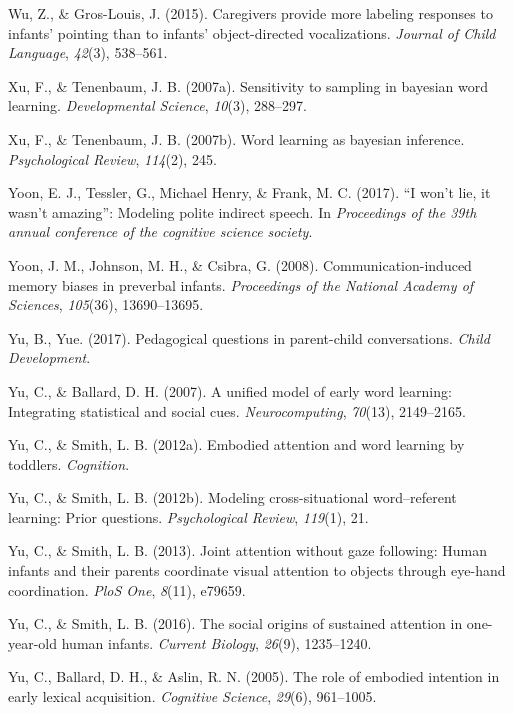 \documentclass[english,floatsintext,man]{apa6}
\theoremstyle{definition}
\theoremstyle{definition}
\theoremstyle{definition}
\theoremstyle{remark}
\begin{document}
\hypertarget{ref-wu2015caregivers}{}
Wu, Z., \& Gros-Louis, J. (2015). Caregivers provide more labeling
responses to infants' pointing than to infants' object-directed
vocalizations. \emph{Journal of Child Language}, \emph{42}(3), 538--561.

\hypertarget{ref-xu2007sampling}{}
Xu, F., \& Tenenbaum, J. B. (2007a). Sensitivity to sampling in bayesian
word learning. \emph{Developmental Science}, \emph{10}(3), 288--297.

\hypertarget{ref-xu2007word}{}
Xu, F., \& Tenenbaum, J. B. (2007b). Word learning as bayesian
inference. \emph{Psychological Review}, \emph{114}(2), 245.

\hypertarget{ref-yoonwon}{}
Yoon, E. J., Tessler, G., Michael Henry, \& Frank, M. C. (2017). ``I
won't lie, it wasn't amazing'': Modeling polite indirect speech. In
\emph{Proceedings of the 39th annual conference of the cognitive science
society}.

\hypertarget{ref-yoon2008communication}{}
Yoon, J. M., Johnson, M. H., \& Csibra, G. (2008). Communication-induced
memory biases in preverbal infants. \emph{Proceedings of the National
Academy of Sciences}, \emph{105}(36), 13690--13695.

\hypertarget{ref-yu2017peagogical}{}
Yu, B., Yue. (2017). Pedagogical questions in parent-child
conversations. \emph{Child Development}.

\hypertarget{ref-yu2007unified}{}
Yu, C., \& Ballard, D. H. (2007). A unified model of early word
learning: Integrating statistical and social cues.
\emph{Neurocomputing}, \emph{70}(13), 2149--2165.

\hypertarget{ref-yu2012embodied}{}
Yu, C., \& Smith, L. B. (2012a). Embodied attention and word learning by
toddlers. \emph{Cognition}.

\hypertarget{ref-yu2012modeling}{}
Yu, C., \& Smith, L. B. (2012b). Modeling cross-situational
word--referent learning: Prior questions. \emph{Psychological Review},
\emph{119}(1), 21.

\hypertarget{ref-yu2013joint}{}
Yu, C., \& Smith, L. B. (2013). Joint attention without gaze following:
Human infants and their parents coordinate visual attention to objects
through eye-hand coordination. \emph{PloS One}, \emph{8}(11), e79659.

\hypertarget{ref-yu2016social}{}
Yu, C., \& Smith, L. B. (2016). The social origins of sustained
attention in one-year-old human infants. \emph{Current Biology},
\emph{26}(9), 1235--1240.

\hypertarget{ref-yu2005role}{}
Yu, C., Ballard, D. H., \& Aslin, R. N. (2005). The role of embodied
intention in early lexical acquisition. \emph{Cognitive Science},
\emph{29}(6), 961--1005.
\end{document}
